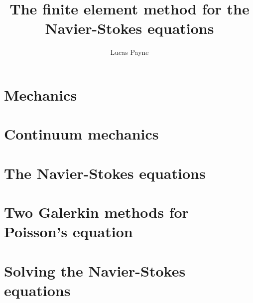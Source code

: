 \documentclass[11pt,a4paper]{memoir}
\begin{document}
\title{\Huge \textbf{The finite element method for the Navier-Stokes equations}}
\author{Lucas Payne}

\maketitle

\tableofcontents

\chapter{Mechanics}


\chapter{Continuum mechanics}


\chapter{The Navier-Stokes equations}


\chapter{Two Galerkin methods for Poisson's equation}


\chapter{Solving the Navier-Stokes equations}
\end{document}
